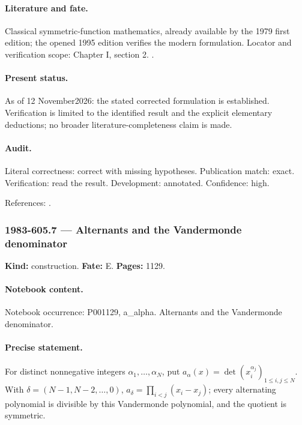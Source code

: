 \paragraph{Literature and fate.} Classical symmetric-function mathematics, already available by the 1979 first edition; the opened 1995 edition verifies the modern formulation. Locator and verification scope: Chapter I, section 2. \cite{macdonald1995symmetric}.

\paragraph{Present status.} As of 12 November2026: the stated corrected formulation is established. Verification is limited to the identified result and the explicit elementary deductions; no broader literature-completeness claim is made.

\paragraph{Audit.} Literal correctness: correct with missing hypotheses. Publication match: exact. Verification: read the result. Development: annotated. Confidence: high.

\noindent References: \citep{macdonald1995symmetric}.\par

\subsubsection{1983-605.7 --- Alternants and the Vandermonde denominator}

\label{item:1983-605.7}

\noindent\textbf{Kind:} construction. \textbf{Fate:} E. \textbf{Pages:} 1129.\par

\paragraph{Notebook content.} Notebook occurrence: P001129, a_alpha. Alternants and the Vandermonde denominator.

\paragraph{Precise statement.} For distinct nonnegative integers \(\alpha_1,\ldots,\alpha_N\), put \(a_\alpha(x)=\det(x_i^{\alpha_j})_{1\le i,j\le N}\). With \(\delta=(N-1,N-2,\ldots,0)\), \(a_\delta=\prod_{i<j}(x_i-x_j)\); every alternating polynomial is divisible by this Vandermonde polynomial, and the quotient is symmetric.

